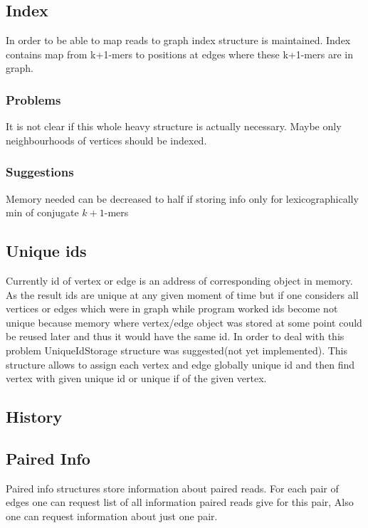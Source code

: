 \documentclass[12pt]{article}
\begin{document}
\subsection{Index}

In order to be able to map reads to graph index structure is maintained. Index contains map from k+1-mers to positions at edges where these k+1-mers are in graph.

\subsubsection{Problems}

It is not clear if this whole heavy structure is actually necessary. Maybe only neighbourhoods of vertices should be indexed.


\subsubsection{Suggestions}
Memory needed can be decreased to half if storing info only for lexicographically min of conjugate $k+1$-mers

\subsection{Unique ids}

Currently id of vertex or edge is an address of corresponding object in memory. As the result ids are unique at any given moment of time but if one considers all vertices or edges which were in graph while program worked ids become not unique because memory where vertex/edge object was stored at some point could be reused later and thus it would have the same id. In order to deal with this problem UniqueIdStorage structure was suggested(not yet implemented). This structure allows to assign each vertex and edge globally unique id and then find vertex with given unique id or unique if of the given vertex.

\subsection{History}

\subsection{Paired Info}

Paired info structures store information about paired reads. For each pair of edges one can request list of all information paired reads give for this pair, Also one can request information about just one pair.
\end{document}

